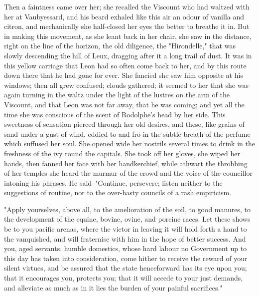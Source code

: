 \documentclass[11pt,twocolumn]{ltugboat}
\begin{document}
Then a faintness came over her; she recalled the Viscount who had
waltzed with her at Vaubyessard, and his beard exhaled like this air an
odour of vanilla and citron, and mechanically she half-closed her eyes
the better to breathe it in. But in making this movement, as she leant
back in her chair, she saw in the distance, right on the line of the
horizon, the old diligence, the "Hirondelle," that was slowly descending
the hill of Leux, dragging after it a long trail of dust. It was in this
yellow carriage that Leon had so often come back to her, and by this
route down there that he had gone for ever. She fancied she saw him
opposite at his windows; then all grew confused; clouds gathered; it
seemed to her that she was again turning in the waltz under the light of
the lustres on the arm of the Viscount, and that Leon was not far away,
that he was coming; and yet all the time she was conscious of the scent
of Rodolphe's head by her side. This sweetness of sensation pierced
through her old desires, and these, like grains of sand under a gust
of wind, eddied to and fro in the subtle breath of the perfume which
suffused her soul. She opened wide her nostrils several times to drink
in the freshness of the ivy round the capitals. She took off her gloves,
she wiped her hands, then fanned her face with her handkerchief, while
athwart the throbbing of her temples she heard the murmur of the
crowd and the voice of the councillor intoning his phrases. He
said--"Continue, persevere; listen neither to the suggestions of
routine, nor to the over-hasty councils of a rash empiricism.

"Apply yourselves, above all, to the amelioration of the soil, to good
manures, to the development of the equine, bovine, ovine, and porcine
races. Let these shows be to you pacific arenas, where the victor in
leaving it will hold forth a hand to the vanquished, and will fraternise
with him in the hope of better success. And you, aged servants, humble
domestics, whose hard labour no Government up to this day has taken into
consideration, come hither to receive the reward of your silent virtues,
and be assured that the state henceforward has its eye upon you; that it
encourages you, protects you; that it will accede to your just
demands, and alleviate as much as in it lies the burden of your painful
sacrifices."
\end{document}
